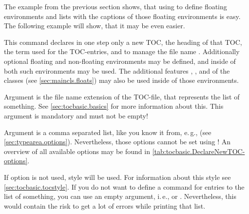 The example from the previous section shows, that using  to
define floating environments and lists with the captions of those floating
environments is easy. The following example will show, that it may be even
easier.

\begin{Declaration}
\end{Declaration}
This command declares in one step only a
new TOC, the heading of that TOC, the term used for the TOC-entries, and to
manage the file name . Additionally optional floating and
non-floating environments may be defined, and inside of both such environments
 may be used. The
additional features , , and 
of the \KOMAScript{} classes (see \autoref{sec:maincls.floats}) may also be
used inside of those environments.

Argument  is the file name extension of the TOC-file, that
represents the list of something. See \autoref{sec:tocbasic.basics} for more
information about this. This argument is mandatory and must not be empty!

Argument  is a comma separated list, like you know it from,
e.\,g.,  (see
\autoref{sec:typearea.options}). Nevertheless, those
options cannot be set using ! An
overview of all available options may be found in
\autoref{tab:tocbasic.DeclareNewTOC-options}.

If option 
is not used, style  will be used. For information about this
style see \autoref{sec:tocbasic.tocstyle}. If you do not want to define a
command for entries to the list of something, you can use an empty argument,
i.\,e.,  or
. Nevertheless, this would contain
the risk to get a lot of errors while printing that list.

